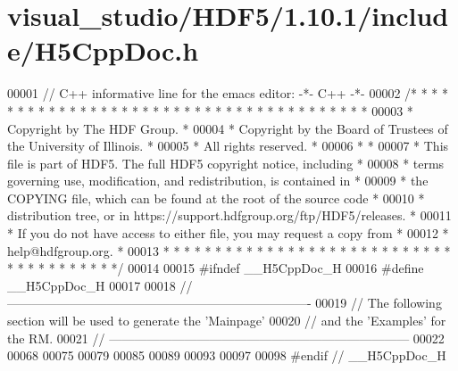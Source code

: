 \hypertarget{visual__studio_2_h_d_f5_21_810_81_2include_2_h5_cpp_doc_8h_source}{}\section{visual\+\_\+studio/\+H\+D\+F5/1.10.1/include/\+H5\+Cpp\+Doc.h}
\label{visual__studio_2_h_d_f5_21_810_81_2include_2_h5_cpp_doc_8h_source}

\begin{DoxyCode}
00001 \textcolor{comment}{// C++ informative line for the emacs editor: -*- C++ -*-}
00002 \textcolor{comment}{/* * * * * * * * * * * * * * * * * * * * * * * * * * * * * * * * * * * * * * *}
00003 \textcolor{comment}{ * Copyright by The HDF Group.                                               *}
00004 \textcolor{comment}{ * Copyright by the Board of Trustees of the University of Illinois.         *}
00005 \textcolor{comment}{ * All rights reserved.                                                      *}
00006 \textcolor{comment}{ *                                                                           *}
00007 \textcolor{comment}{ * This file is part of HDF5.  The full HDF5 copyright notice, including     *}
00008 \textcolor{comment}{ * terms governing use, modification, and redistribution, is contained in    *}
00009 \textcolor{comment}{ * the COPYING file, which can be found at the root of the source code       *}
00010 \textcolor{comment}{ * distribution tree, or in https://support.hdfgroup.org/ftp/HDF5/releases.  *}
00011 \textcolor{comment}{ * If you do not have access to either file, you may request a copy from     *}
00012 \textcolor{comment}{ * help@hdfgroup.org.                                                        *}
00013 \textcolor{comment}{ * * * * * * * * * * * * * * * * * * * * * * * * * * * * * * * * * * * * * * */}
00014 
00015 \textcolor{preprocessor}{#ifndef \_\_H5CppDoc\_H}
00016 \textcolor{preprocessor}{#define \_\_H5CppDoc\_H}
00017 
00018 \textcolor{comment}{//-------------------------------------------------------------------------}
00019 \textcolor{comment}{// The following section will be used to generate the 'Mainpage'}
00020 \textcolor{comment}{// and the 'Examples' for the RM.}
00021 \textcolor{comment}{// ------------------------------------------------------------------------}
00022 
00068 
00075 
00079 
00085 
00089 
00093 
00097 
00098 \textcolor{preprocessor}{#endif // \_\_H5CppDoc\_H}
\end{DoxyCode}
